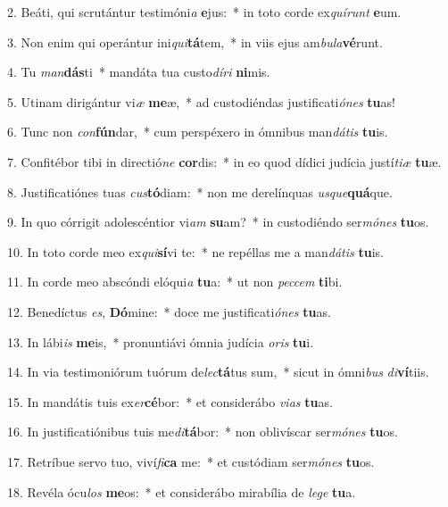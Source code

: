 2. Beáti, qui scrutántur testimóni\textit{a} \textbf{e}jus:~*  in toto corde ex\textit{quí}\textit{runt} \textbf{e}um.\

3. Non enim qui operántur ini\textit{qui}\textbf{tá}tem,~*  in viis ejus am\textit{bu}\textit{la}\textbf{vé}runt.\

4. Tu \textit{man}\textbf{dás}ti~*  mandáta tua custo\textit{dí}\textit{ri} \textbf{ni}mis.\

5. Utinam dirigántur vi\textit{æ} \textbf{me}æ,~*  ad custodiéndas justificati\textit{ó}\textit{nes} \textbf{tu}as!\

6. Tunc non \textit{con}\textbf{fún}dar,~*  cum perspéxero in ómnibus man\textit{dá}\textit{tis} \textbf{tu}is.\

7. Confitébor tibi in directió\textit{ne} \textbf{cor}dis:~*  in eo quod dídici judícia justí\textit{ti}\textit{æ} \textbf{tu}æ.\

8. Justificatiónes tuas \textit{cus}\textbf{tó}diam:~*  non me derelínquas \textit{us}\textit{que}\textbf{quá}que.\

9. In quo córrigit adolescéntior vi\textit{am} \textbf{su}am?~*  in custodiéndo ser\textit{mó}\textit{nes} \textbf{tu}os.\

10. In toto corde meo ex\textit{qui}\textbf{sí}vi te:~*  ne repéllas me a man\textit{dá}\textit{tis} \textbf{tu}is.\

11. In corde meo abscóndi elóqui\textit{a} \textbf{tu}a:~*  ut non \textit{pec}\textit{cem} \textbf{ti}bi.\

12. Benedíctus \textit{es}, \textbf{Dó}mine:~*  doce me justificati\textit{ó}\textit{nes} \textbf{tu}as.\

13. In lábi\textit{is} \textbf{me}is,~*  pronuntiávi ómnia judícia \textit{o}\textit{ris} \textbf{tu}i.\

14. In via testimoniórum tuórum de\textit{lec}\textbf{tá}tus sum,~*  sicut in ómni\textit{bus} \textit{di}\textbf{ví}tiis.\

15. In mandátis tuis ex\textit{er}\textbf{cé}bor:~*  et considerábo \textit{vi}\textit{as} \textbf{tu}as.\

16. In justificatiónibus tuis me\textit{di}\textbf{tá}bor:~*  non oblivíscar ser\textit{mó}\textit{nes} \textbf{tu}os.\

17. Retríbue servo tuo, viví\textit{fi}\textbf{ca} me:~*  et custódiam ser\textit{mó}\textit{nes} \textbf{tu}os.\

18. Revéla ócu\textit{los} \textbf{me}os:~*  et considerábo mirabília de \textit{le}\textit{ge} \textbf{tu}a.\

